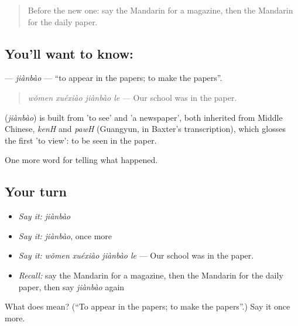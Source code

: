 \label{lesson:ZH-C293-jianbao}



\begin{quote}
Before the new one: say the Mandarin for a magazine, then the Mandarin for the daily paper.
\end{quote}

\subsection*{You'll want to know: }
\textbf{} — \emph{jiànbào} — \textquotedblleft{}to appear in the papers; to make the papers\textquotedblright{}.

\begin{quote}
\textbf{} \emph{wǒmen xuéxiào jiànbào le} — Our school was in the paper.
\end{quote}

\begin{cousinweb}
\textbf{} (\emph{jiànbào}) is built from  'to see' and  'a newspaper', both inherited from Middle Chinese, \emph{kenH} and \emph{pawH} (Guangyun, in Baxter's transcription), which glosses the first 'to view': to be seen in the paper.
\end{cousinweb}

\begin{grammarlens}[title={What you've built}]
One more word for telling what happened.
\end{grammarlens}

\subsection*{Your turn}
\begin{itemize}
\raggedright
  \item \emph{Say it:} \emph{jiànbào}
  \item \emph{Say it:} \emph{jiànbào}, once more
  \item \emph{Say it:} \emph{wǒmen xuéxiào jiànbào le} — Our school was in the paper.
  \item \emph{Recall:} say the Mandarin for a magazine, then the Mandarin for the daily paper, then say \emph{jiànbào} again
\end{itemize}

\begin{tcolorbox}[breakable,colback=teal!4,colframe=teal!35!black,title={Before you move on}]
What does  mean? (\textquotedblleft{}To appear in the papers; to make the papers\textquotedblright{}.) Say it once more.
\end{tcolorbox}

